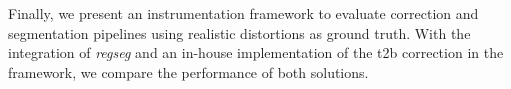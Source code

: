 Finally, we present an instrumentation framework to evaluate correction and
  segmentation pipelines using realistic distortions as ground truth.
With the integration of \emph{regseg} and an in-house implementation of the 
  \gls*{t2b} correction in the framework, we compare the performance
  of both solutions.
